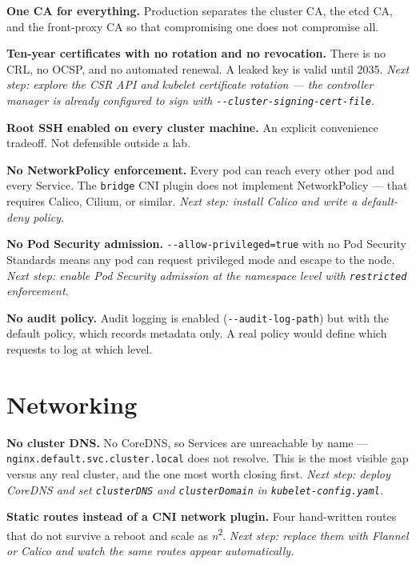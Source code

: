 \documentclass[11pt,oneside]{report}
\begin{document}
\textbf{One CA for
everything.}
Production separates
the cluster CA, the
etcd CA, and the
front-proxy CA so
that compromising
one does not
compromise all.

\textbf{Ten-year
certificates with no
rotation and no
revocation.} There
is no CRL, no OCSP,
and no automated
renewal. A leaked
key is valid until
2035. \emph{Next
step: explore the
CSR API and kubelet
certificate rotation
--- the controller
manager is already
configured to sign
with
\texttt{-\/-cluster-}\allowbreak{}\texttt{signing-}\allowbreak{}\texttt{cert-}\allowbreak{}\texttt{file}.}

\textbf{Root SSH
enabled on every
cluster machine.} An
explicit convenience
tradeoff. Not
defensible outside a
lab.

\textbf{No
NetworkPolicy
enforcement.} Every
pod can reach every
other pod and every
Service. The
\texttt{bridge} CNI
plugin does not
implement
NetworkPolicy ---
that requires
Calico, Cilium, or
similar. \emph{Next
step: install Calico
and write a
default-deny
policy.}

\textbf{No Pod
Security admission.}
\texttt{-\/-allow-}\allowbreak{}\texttt{privileged=true}
with no Pod Security
Standards means any
pod can request
privileged mode and
escape to the node.
\emph{Next step:
enable Pod Security
admission at the
namespace level with
\texttt{restricted}
enforcement.}

\textbf{No audit
policy.} Audit
logging is enabled
(\texttt{-\/-audit-}\allowbreak{}\texttt{log-}\allowbreak{}\texttt{path})
but with the default
policy, which
records metadata
only. A real policy
would define which
requests to log at
which level.

\hypertarget{networking}{%
\section{Networking}\label{networking}}

\textbf{No cluster
DNS.} No CoreDNS, so
Services are
unreachable by name
---
\texttt{nginx.}\allowbreak{}\texttt{default.}\allowbreak{}\texttt{svc.}\allowbreak{}\texttt{cluster.}\allowbreak{}\texttt{local}
does not resolve.
This is the most
visible gap versus
any real cluster,
and the one most
worth closing first.
\emph{Next step:
deploy CoreDNS and
set
\texttt{clusterDNS}
and
\texttt{clusterDomain}
in
\texttt{kubelet-}\allowbreak{}\texttt{config.}\allowbreak{}\texttt{yaml}.}

\textbf{Static
routes instead of a
CNI network plugin.}
Four hand-written
routes that do not
survive a reboot and
scale as
\emph{n}\textsuperscript{2}.
\emph{Next step:
replace them with
Flannel or Calico
and watch the same
routes appear
automatically.}
\end{document}
